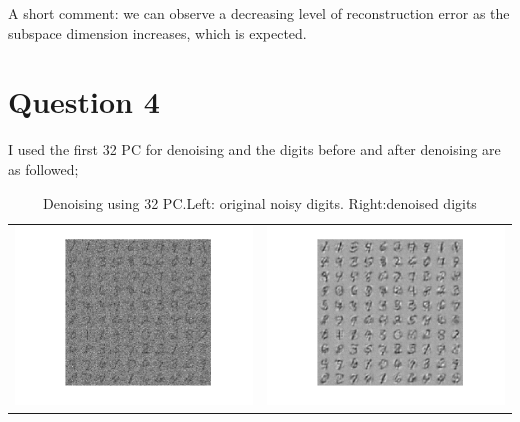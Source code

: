 \documentclass[paper=a4, fontsize=11pt]{scrartcl} %
\numberwithin{equation}{section} %
\numberwithin{figure}{section} %
\numberwithin{table}{section} %
\begin{document}
A short comment: we can observe a decreasing level of reconstruction error as the subspace dimension increases, which is expected.


\section {Question 4}

I used the first 32 PC for denoising and the digits before and after denoising are as followed;

\begin{table}[H]
\caption{Denoising using 32 PC.\newline Left: original noisy digits. \newline Right:denoised digits}
\centering
\begin{tabular}{cc}
    \includegraphics[scale=.4]{noisy_digits} &
    \includegraphics[scale=.4]{denoised_digits}
\end {tabular}
\end {table}
\end{document}
